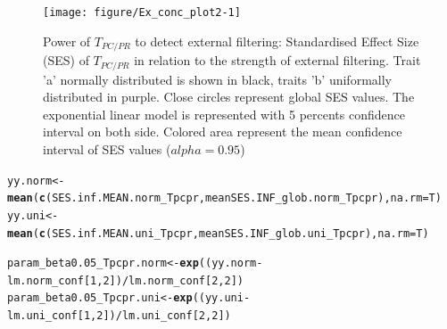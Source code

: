 \documentclass[12pt]{article}\usepackage[]{graphicx}\usepackage[]{color}
\makeatletter
\newcommand{\hlnum}[1]{\textcolor[rgb]{0.686,0.059,0.569}{#1}}%
\newcommand{\hlopt}[1]{\textcolor[rgb]{0,0,0}{#1}}%
\newcommand{\hlstd}[1]{\textcolor[rgb]{0.345,0.345,0.345}{#1}}%
\newcommand{\hlkwb}[1]{\textcolor[rgb]{0.69,0.353,0.396}{#1}}%
\newcommand{\hlkwc}[1]{\textcolor[rgb]{0.333,0.667,0.333}{#1}}%
\newcommand{\hlkwd}[1]{\textcolor[rgb]{0.737,0.353,0.396}{\textbf{#1}}}%
\newenvironment{kframe}{%
 \def\at@end@of@kframe{}%
 \ifinner\ifhmode%
  \def\at@end@of@kframe{\end{minipage}}%
  \begin{minipage}{\columnwidth}%
 \fi\fi%
 \def\FrameCommand##1{\hskip\@totalleftmargin \hskip-\fboxsep
 \colorbox{shadecolor}{##1}\hskip-\fboxsep
     \hskip-\linewidth \hskip-\@totalleftmargin \hskip\columnwidth}%
 \MakeFramed {\advance\hsize-\width
   \@totalleftmargin\z@ \linewidth\hsize
   \@setminipage}}%
 {\par\unskip\endMakeFramed%
 \at@end@of@kframe}
\newenvironment{knitrout}{}{} %
\makeatother
\begin{document}
\begin{knitrout}
\begin{figure}
{\centering \texttt{[image: figure/Ex\_conc\_plot2-1]} 

}

\caption[Power of $T_{PC/PR}$ to detect external filtering]{Power of $T_{PC/PR}$ to detect external filtering: Standardised Effect Size (SES) of $T_{PC/PR}$ in relation to the strength of external filtering. Trait 'a' normally distributed is shown in black, traits 'b' uniformally distributed in purple. Close circles represent global SES values. The exponential linear model is represented with 5 percents confidence interval on both side. Colored area represent the mean confidence interval of SES values ($alpha = 0.95$)\label{fig:Ex_conc_plot2}}
\end{figure}


\end{knitrout}

\begin{knitrout}\small
{}\color{fgcolor}\begin{kframe}
\begin{alltt}
\hlstd{yy.norm} \hlkwb{<-} \hlkwd{mean}\hlstd{(}\hlkwd{c}\hlstd{(SES.inf.MEAN.norm_Tpcpr, meanSES.INF_glob.norm_Tpcpr),} \hlkwc{na.rm} \hlstd{= T)}
\hlstd{yy.uni} \hlkwb{<-} \hlkwd{mean}\hlstd{(}\hlkwd{c}\hlstd{(SES.inf.MEAN.uni_Tpcpr, meanSES.INF_glob.uni_Tpcpr),} \hlkwc{na.rm} \hlstd{= T)}

\hlstd{param_beta0.05_Tpcpr.norm} \hlkwb{<-} \hlkwd{exp}\hlstd{( (yy.norm} \hlopt{-} \hlstd{lm.norm_conf [}\hlnum{1}\hlstd{,} \hlnum{2}\hlstd{])} \hlopt{/} \hlstd{lm.norm_conf [}\hlnum{2}\hlstd{,} \hlnum{2}\hlstd{] )}
\hlstd{param_beta0.05_Tpcpr.uni} \hlkwb{<-} \hlkwd{exp}\hlstd{( (yy.uni} \hlopt{-} \hlstd{lm.uni_conf [}\hlnum{1}\hlstd{,} \hlnum{2}\hlstd{])} \hlopt{/} \hlstd{lm.uni_conf [}\hlnum{2}\hlstd{,} \hlnum{2}\hlstd{] )}
\end{alltt}
\end{kframe}
\end{knitrout}
\end{document}
